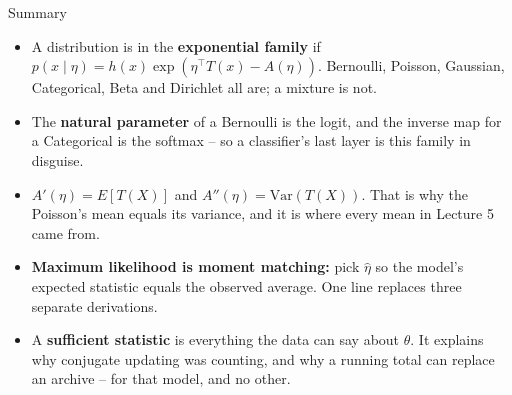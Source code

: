 \begin{frame}{Summary}
\begin{itemize}
  \item A distribution is in the \textbf{exponential family} if $p(x\mid\eta) = h(x)\exp(\eta^{\top}T(x) - A(\eta))$. Bernoulli, Poisson, Gaussian, Categorical, Beta and Dirichlet all are; a mixture is not.
  \pause
  \item The \textbf{natural parameter} of a Bernoulli is the logit, and the inverse map for a Categorical is the softmax -- so a classifier's last layer is this family in disguise.
  \pause
  \item $A'(\eta) = E[T(X)]$ and $A''(\eta) = \mathrm{Var}(T(X))$. That is why the Poisson's mean equals its variance, and it is where every mean in Lecture 5 came from.
  \pause
  \item \textbf{Maximum likelihood is moment matching:} pick $\hat\eta$ so the model's expected statistic equals the observed average. One line replaces three separate derivations.
  \pause
  \item A \textbf{sufficient statistic} is everything the data can say about $\theta$. It explains why conjugate updating was counting, and why a running total can replace an archive -- for that model, and no other.
\end{itemize}
\end{frame}
